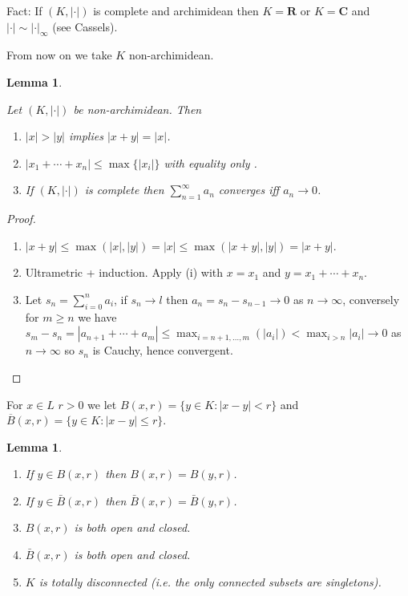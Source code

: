 \documentclass[10pt,]{book}
\newcommand{\lt}{<}
\newcommand{\gt}{>}
\theoremstyle{plain}
\newtheorem{lemma}[theorem]{Lemma}
\theoremstyle{definition}
\newcommand{\CC}{\mathbf{C}}
\newcommand{\RR}{\mathbf{R}}
\newcommand{\ab}{|\cdot|}
\begin{document}
        Fact: If \((K,\ab)\) is complete and archimidean then \(K= \RR\) or \(K= \CC\) and \(\ab \sim \ab_\infty\) (see Cassels).
\par
From now on we take \(K\) non-archimidean.%
\begin{lemma}\label{lemma-4}

          Let \((K,\ab)\) be non-archimidean.
          Then
          \begin{enumerate}
\item{}\(|x| \gt|y|\) implies \(|x+y | = |x|\).\item{}\(|x_1 +\cdots + x_n| \le \max\{|x_i|\}\) with equality only .\item{}If \((K,\ab)\) is complete then \(\sum_{n=1}^\infty a_n\) converges iff \(a_n\to 0\).\end{enumerate}
\end{lemma}
\begin{proof}
\begin{enumerate}
\item{}\(|x+y| \le \max(|x|,|y|) = |x| \le \max(|x+y|, |y|) = |x + y|\).\item{}Ultrametric + induction. Apply (i) with \(x = x_1\) and \(y = x_1 + \cdots + x_n\).\item{}Let \(s_n = \sum_{i=0}^{n} a_i\), if \(s_n \to l\) then \(a_n = s_n - s_{n-1} \to 0\) as \(n \to \infty\), conversely for \(m \ge n\) we have \(s_m - s_n = |a_{n+1} + \cdots + a_m| \le \max_{i = n+1,\ldots,m}(|a_i|) \lt \max_{i \gt n} |a_i| \to 0\) as \(n \to \infty\) so \(s_n\) is Cauchy, hence convergent.\end{enumerate}
\end{proof}
\par
For \(x\in L\) \(r \gt 0\) we let \(B(x,r) = \{y\in K : |x - y| \lt r\}\) and \(\overline{B}(x,r) = \{y\in K : |x - y| \le r\}\).%
\begin{lemma}\label{lemma-5}
\begin{enumerate}
\item{}If \(y\in B(x,r)\) then \(B (x,r ) = B(y,r)\).\item{}If \(y\in \bar{B}(x,r)\) then \(\bar{B}(x,r) = \bar{B}(y,r)\).\item{}\(B(x,r)\) is both open and closed.\item{}\(\bar{B}(x,r)\) is both open and closed.\item{}\(K\) is totally disconnected (i.e. the only connected subsets are singletons).\end{enumerate}
\end{lemma}
\end{document}
